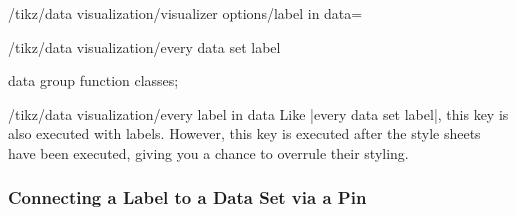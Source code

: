 \begin{key}{/tikz/data visualization/visualizer options/label in data=}
\begin{stylekey}{/tikz/data visualization/every data set label}
\begin{codeexample}[width=6.3cm]
\tikz \datavisualization [
  school book axes,
  x axis={label=$x$},
  visualize as smooth line/.list={log, lin, squared, exp},
  every data set label/.append style={text colored},
  log=    {label in data={text'=$\log x$, when=y is -1}},
  lin=    {label in data={text=$x/2$,
                    node style=sloped,    when=x is 2}},
  squared={label in data={text=$x^2$,     when=x is 1.1}},
  exp=    {label in data={text=$e^x$,
                    node style=sloped,    when=x is -2}},
  style sheet=vary hue]
data group {function classes};
\end{codeexample}
  \end{stylekey}
  
  \begin{stylekey}{/tikz/data visualization/every label in data}
    Like |every data set label|, this key is also executed with
    labels. However, this key is executed after the style sheets have
    been executed, giving you a chance to overrule their styling.
  \end{stylekey}
\end{key}

\subsubsection{Connecting a Label to a Data Set via a Pin} 

